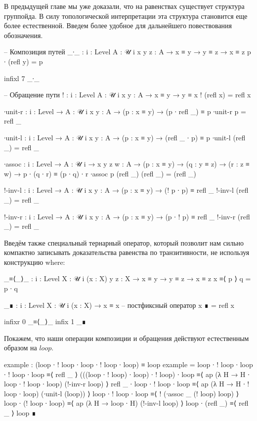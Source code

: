 \documentclass{article}[12pt]
\begin{document}
В предыдущей главе мы уже доказали, что на равенствах существует структура группойда. В
силу топологической интерпретации эта структура становится еще более естественной. Введем
более удобное для дальнейшего повествования обозначения.
\begin{code}
-- Композиция путей
_∙_ : {i : Level} {A : 𝒰 i} {x y z : A} → x ≡ y → y ≡ z → x ≡ z
p ∙ (refl y) = p
    
infixl 7 _∙_

-- Обращение пути
! : {i : Level} {A : 𝒰 i} {x y : A} → x ≡ y → y ≡ x
! (refl x) = refl x

∙unit-r : {i : Level} → {A : 𝒰 i} {x y : A} → (p : x ≡ y) → (p ∙ refl _) ≡ p
∙unit-r p = refl _

∙unit-l : {i : Level} → {A : 𝒰 i} {x y : A} → (p : x ≡ y) → (refl _ ∙ p) ≡ p
∙unit-l (refl _) = refl _

∙assoc : {i : Level} → {A : 𝒰 i} 
         → {x y z w : A} 
         → (p : x ≡ y) → (q : y ≡ z) → (r : z ≡ w)
         → p ∙ (q ∙ r) ≡ (p ∙ q) ∙ r
∙assoc p (refl _) (refl _) = (refl _)

!-inv-l : {i : Level} → {A : 𝒰 i} {x y : A} → (p : x ≡ y) → (! p ∙ p) ≡ refl _
!-inv-l (refl _) = refl _

!-inv-r : {i : Level} → {A : 𝒰 i} {x y : A} → (p : x ≡ y) → (p ∙ ! p) ≡ refl _
!-inv-r (refl _) = refl _
\end{code}
Введём также специальный тернарный оператор, который позволит нам сильно
компактно записывать доказательства равенства по транзитивности, не используя конструкцию
where:
\begin{code}
_≡⟨_⟩_ : {i : Level} {X : 𝒰 i} (x : X) {y z : X} 
         → x ≡ y → y ≡ z → x ≡ z
x ≡⟨ p ⟩ q = p ∙ q

_∎ : {i : Level} {X : 𝒰 i} (x : X) → x ≡ x -- постфиксный оператор
x ∎ = refl x

infixr  0 _≡⟨_⟩_
infix   1 _∎
\end{code}

Покажем, что наши операции композиции и обращения действуют естественным образом
на $loop$.
\begin{code}
example : (loop ∙ ! loop ∙ loop ∙ ! loop  ∙ loop) ≡ loop
example = 
    loop ∙ ! loop ∙ loop ∙ ! loop  ∙ loop  ≡⟨ refl _ ⟩
    (((loop ∙ ! loop) ∙ loop) ∙ ! loop)  ∙ loop  ≡⟨ ap (λ H → H ∙ loop ∙ ! loop ∙ loop) (!-inv-r loop)  ⟩
    refl _ ∙ loop ∙ ! loop ∙ loop                ≡⟨  ap (λ H → H ∙ ! loop ∙ loop) (∙unit-l (loop))  ⟩
    loop ∙ ! loop ∙ loop                         ≡⟨  ! (∙assoc _ (! loop) loop)  ⟩
    loop ∙ (! loop ∙ loop)                       ≡⟨  ap (λ H → loop ∙ H) (!-inv-l loop)  ⟩
    loop ∙ (refl _)                              ≡⟨ refl _ ⟩ 
    loop ∎
\end{code}
\end{document}
